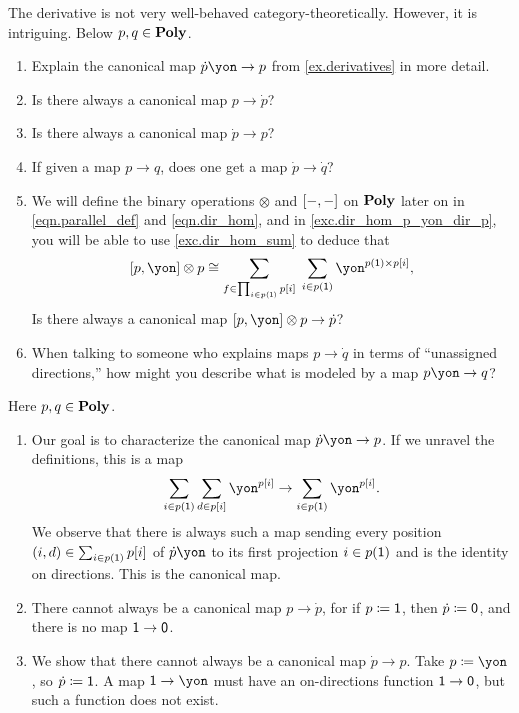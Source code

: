 \documentclass[Book-Poly]{subfiles}
\begin{document}
\begin{exercise}
The derivative is not very well-behaved category-theoretically.
However, it is intriguing.
Below $p, q \in \mathbf{Poly}$.
\begin{enumerate}
	\item Explain the canonical map $\dot{p}\yon\to p$ from \cref{ex.derivatives} in more detail.
	\item Is there always a canonical map $p\to \dot{p}$?
	\item Is there always a canonical map $\dot{p}\to p$?
	\item If given a map $p\to q$, does one get a map $\dot{p}\to\dot{q}$?
	\item We will define the binary operations $\otimes$ and $[-,-]$ on $\mathbf{Poly}$ later on in \eqref{eqn.parallel_def} and \eqref{eqn.dir_hom}, and in \cref{exc.dir_hom_p_yon_dir_p}, you will be able to use \cref{exc.dir_hom_sum} to deduce that
	\begin{equation} \label{eqn.dir_hom_p_yon_dir_p}
	    \ihom{p, \yon} \otimes p \iso \sum_{f \in \prod_{i \in p(\1)} p[i]} \; \sum_{i \in p(\1)} \yon^{p(\1) \times p[i]},
	\end{equation}
	Is there always a canonical map $\ihom{p,\yon}\otimes p\to \dot{p}$?
	\item When talking to someone who explains maps $p\to\dot{q}$ in terms of ``unassigned directions,'' how might you describe what is modeled by a map $p\yon\to q$?
	\qedhere
\end{enumerate}
\begin{solution}
Here $p, q \in \mathbf{Poly}$.
\begin{enumerate}
	\item Our goal is to characterize the canonical map $\dot{p}\yon\to p$.
	If we unravel the definitions, this is a map
	\[
	    \sum_{i \in p(\1)} \sum_{d \in p[i]} \yon^{p[i]} \to \sum_{i \in p(\1)} \yon^{p[i]}.
	\]
	We observe that there is always such a map sending every position $(i, d) \in \sum_{i \in p(\textsf{1})} p[i]$ of $\dot{p}\yon$ to its first projection $i \in p(\textsf{1})$ and is the identity on directions.
	This is the canonical map.

	\item There cannot always be a canonical map $p\to \dot{p}$, for if $p \coloneqq \textsf{1}$, then $\dot{p} \coloneqq \textsf{0}$, and there is no map $\textsf{1} \to \textsf{0}$.
	
	\item We show that there cannot always be a canonical map $\dot{p}\to p$.
	Take $p \coloneqq \yon$, so $\dot{p} \coloneqq \textsf{1}$.
	A map $\1 \to \yon$ must have an on-directions function $\textsf{1} \to \textsf{0}$, but such a function does not exist.
	

\end{enumerate}
\end{solution}
\end{exercise}
\end{document}
